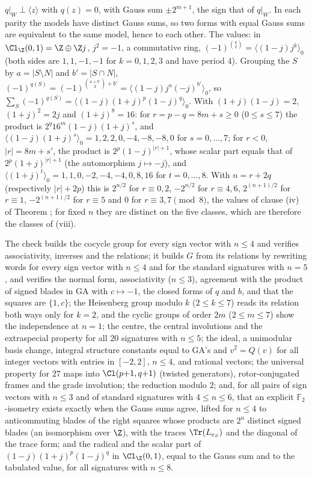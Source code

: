 $q|_{W} \perp \langle z\rangle$ with $q(z) = 0$, with Gauss sum $\pm 2^{m+1}$, the sign that of $q|_{W}$. In each parity the models have distinct Gauss sums, so two forms with equal Gauss sums are equivalent to the same model, hence to each other. The values: in $\Cl_{\Z}(0,1) = \Z \oplus \Z j$, $j^{2} = -1$, a commutative ring, $(-1)^{\binom{k}{2}} = \langle (1 - j)j^{k}\rangle_{0}$ (both sides are $1, 1, -1, -1$ for $k = 0, 1, 2, 3$ and have period $4$). Grouping the $S$ by $a = |S \setminus N|$ and $b' = |S \cap N|$, $(-1)^{q(S)} = (-1)^{\binom{a + b'}{2} + b'} = \langle (1 - j)j^{a}(-j)^{b'}\rangle_{0}$, so $\sum_{S}(-1)^{q(S)} = \langle (1 - j)(1 + j)^{p}(1 - j)^{q}\rangle_{0}$. With $(1 + j)(1 - j) = 2$, $(1 + j)^{2} = 2j$ and $(1 + j)^{8} = 16$: for $r = p - q = 8m + s \ge 0$ ($0 \le s \le 7$) the product is $2^{q}16^{m}(1 - j)(1 + j)^{s}$, and $\langle (1 - j)(1 + j)^{s}\rangle_{0} = 1, 2, 2, 0, -4, -8, -8, 0$ for $s = 0, \dots, 7$; for $r < 0$, $|r| = 8m + s'$, the product is $2^{p}(1 - j)^{|r| + 1}$, whose scalar part equals that of $2^{p}(1 + j)^{|r| + 1}$ (the automorphism $j \mapsto -j$), and $\langle (1 + j)^{t}\rangle_{0} = 1, 1, 0, -2, -4, -4, 0, 8, 16$ for $t = 0, \dots, 8$. With $n = r + 2q$ (respectively $|r| + 2p$) this is $2^{n/2}$ for $r \equiv 0, 2$, $-2^{n/2}$ for $r \equiv 4, 6$, $2^{(n+1)/2}$ for $r \equiv 1$, $-2^{(n+1)/2}$ for $r \equiv 5$ and $0$ for $r \equiv 3, 7 \pmod 8$, the values of clause (iv) of Theorem ; for fixed $n$ they are distinct on the five classes, which are therefore the classes of (viii).

The check builds the cocycle group for every sign vector with $n \le 4$ and verifies associativity, inverses and the relations; it builds $G$ from its relations by rewriting words for every sign vector with $n \le 4$ and for the standard signatures with $n = 5$, and verifies the normal form, associativity ($n \le 3$), agreement with the product of signed blades in GA with $c \mapsto -1$, the closed forms of $q$ and $b$, and that the squares are $\{1, c\}$; the Heisenberg group modulo $k$ ($2 \le k \le 7$) reads its relation both ways only for $k = 2$, and the cyclic groups of order $2m$ ($2 \le m \le 7$) show the independence at $n = 1$; the centre, the central involutions and the extraspecial property for all $20$ signatures with $n \le 5$; the ideal, a unimodular basis change, integral structure constants equal to GA's and $v^{2} = Q(v)$ for all integer vectors with entries in $[-2, 2]$, $n \le 4$, and rational vectors; the universal property for $27$ maps into $\Cl(p{+}1, q{+}1)$ (twisted generators), rotor-conjugated frames and the grade involution; the reduction modulo $2$; and, for all pairs of sign vectors with $n \le 3$ and of standard signatures with $4 \le n \le 6$, that an explicit $\mathbb{F}_{2}$-isometry exists exactly when the Gauss sums agree, lifted for $n \le 4$ to anticommuting blades of the right squares whose products are $2^{n}$ distinct signed blades (an isomorphism over $\Z$), with the traces $\Tr(L_{e_{S}})$ and the diagonal of the trace form; and the radical and the scalar part of $(1 - j)(1 + j)^{p}(1 - j)^{q}$ in $\Cl_{\Z}(0,1)$, equal to the Gauss sum and to the tabulated value, for all signatures with $n \le 8$.
